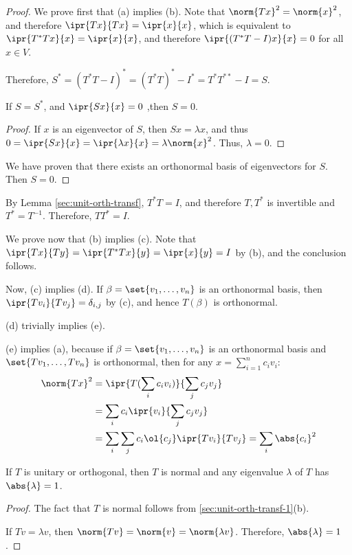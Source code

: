 \documentclass[11pt]{scrartcl}
\begin{document}
  \begin{proof}
    \hfill

    We prove first that (a) implies (b). Note that
    $\norm{Tx}^2= \norm{x}^2$, and therefore
    $\ipr{Tx}{Tx} = \ipr{x}{x}$, which is equivalent to
    $\ipr{T^{*}Tx}{x} = \ipr{x}{x}$, and therefore
    $\ipr{(T^{*}T-I)x}{x} = 0$ for all $x\in V$.

    Therefore, $S^{*} = (T^{*}T - I)^{*} = (T^{*}T)^{*}-I^{*} = T^{*}T^{**} - I =S$.

    \begin{claim*}
      \label{sec:unit-orth-transf}
      If $S = S^{*}$, and $\ipr{Sx}{x} = 0$ ,then $S = 0$.
    \end{claim*}

    \begin{proof}
      \hfill

      If $x$ is an eigenvector of $S$, then $Sx = \lambda x$, and thus
      $0 = \ipr{Sx}{x} = \ipr{\lambda x}{x}=\lambda\norm{x}^2$. Thus, $\lambda = 0$.
    \end{proof}

    We have proven that there exists an orthonormal basis of eigenvectors for $S$. Then $S=0$.
  \end{proof}

  By Lemma \ref{sec:unit-orth-transf}, $T^{*}T = I$, and therefore
  $T, T^{*}$ is invertible and $T^{*} = T^{-1}$. Therefore,
  $TT^{*} = I$.

  We prove now that (b) implies (c). Note that
  $\ipr{Tx}{Ty} =\ipr{T^{*}Tx}{y} = \ipr{x}{y}=I$ by (b), and the conclusion follows.

  Now, (c) implies (d). If $\beta = \set{v_1, \dots, v_n}$ is an orthonormal basis, then $\ipr{Tv_{i}}{Tv_{j}} = \delta_{i,j}$ by (c), and hence $T(\beta)$ is orthonormal.

  (d) trivially implies (e).

  (e) implies (a), because if $\beta = \set{v_1, \dots, v_n}$ is an orthonormal basis and $\set{Tv_1, \dots, Tv_n}$ is orthonormal, then for any $x=\sum_{i=1}^nc_iv_i$:
  \begin{align}
    \norm{Tx}^2 & = \ipr{T(\sum_{i}c_iv_i)}{\sum_jc_jv_j} \\
                & = \sum_ic_i \ipr{v_{i}}{\sum_{j}c_jv_j} \\
                & = \sum_i\sum_jc_i\ol{c_j}\ipr{Tv_i}{Tv_j} = \sum_i\abs{c_i}^2
  \end{align}

  \begin{corollary}
    \label{sec:unit-orth-transf-2}
If $T$ is unitary or orthogonal, then $T$ is normal and any eigenvalue $\lambda$ of $T$ has $\abs{\lambda}=1$.
\end{corollary}
\begin{proof}
  \hfill

  The fact that $T$ is normal follows from \ref{sec:unit-orth-transf-1}(b).

  If $Tv = \lambda v$, then $\norm{Tv} = \norm{v} = \norm{\lambda v}$. Therefore, $\abs{\lambda}=1$.
\end{proof}
\end{document}

